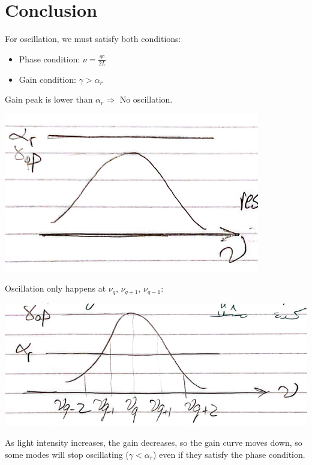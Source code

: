 \documentclass[11pt]{article}
\begin{document}
\section{Conclusion}
For oscillation, we must satisfy both conditions:
\begin{itemize}
    \item Phase condition: $\nu = \frac{qc}{2L}$
    \item Gain condition: $\gamma > \alpha_r$
\end{itemize}
Gain peak is lower than $\alpha_r \Rightarrow$ No oscillation. 
\begin{center}
    \includegraphics[scale=0.8]{11.png}
\end{center}
Oscillation only happens at $\nu_q$, $\nu_{q+1}$, $\nu_{q-1}$:
\begin{center}
    \includegraphics[scale=0.8]{12.png}
\end{center}
As light intensity increases, the gain decreases, so the gain curve moves down, so some modes will stop oscillating ($\gamma < \alpha_r$) even if they satisfy the phase condition.
\end{document}
